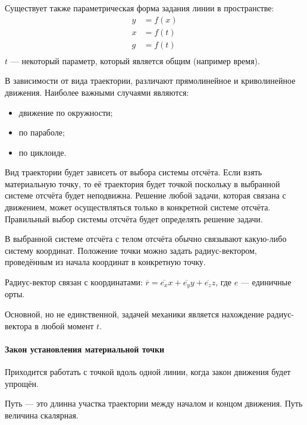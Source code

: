 \documentclass[10pt]{extbook}
\begin{document}
Существует также параметрическая форма задания линии в пространстве:
\begin{align*}
	y & = f(x) \\
	x & = f(t) \\
	g & = f(t) \\
\end{align*}
\( t \) --- некоторый параметр, который является общим (например время).

В зависимости от вида траектории, различают прямолинейное и криволинейное
движения. Наиболее важными случаями являются:
\begin{itemize}
	\item движение по окружности;
	\item по параболе;
	\item по циклоиде.
\end{itemize}

Вид траектории будет зависеть от выбора системы отсчёта. Если взять
материальную точку, то её траектория будет точкой поскольку в выбранной системе
отсчёта будет неподвижна. Решение любой задачи, которая связана с движением,
может осуществляться только в конкретной системе отсчёта. Правильный выбор
системы отсчёта будет определять решение задачи.

В выбранной системе отсчёта с телом отсчёта обычно связывают какую-либо
систему координат. Положение точки можно задать радиус-вектором,
проведённым из начала координат в конкретную точку.

Радиус-вектор связан с координатами: \( \overline{r} = \overline{e_x} x
+ \overline{e_y} y + \overline{e_z} z \), где $e$ --- единичные орты.

Основной, но не единственной, задачей механики является нахождение
радиус-вектора в любой момент $t$.

\paragraph{Закон установления материальной точки}
Приходится работать с точкой вдоль одной линии, когда закон движения будет
упрощён.

Путь --- это длинна участка траектории между началом и концом движения. Путь
величина скалярная.
\end{document}

